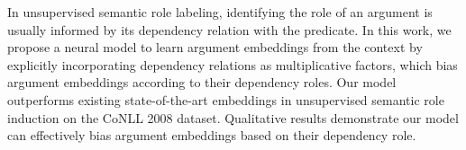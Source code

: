 In unsupervised semantic role labeling, identifying the role of an argument is usually informed by its dependency relation with the predicate. In this work, we propose a neural model to learn argument embeddings from the context by explicitly incorporating dependency relations as multiplicative factors, which bias argument embeddings according to their dependency roles. Our model outperforms existing state-of-the-art embeddings in unsupervised semantic role induction on the CoNLL 2008 dataset. Qualitative results demonstrate our model can effectively bias argument embeddings based on their dependency role.

